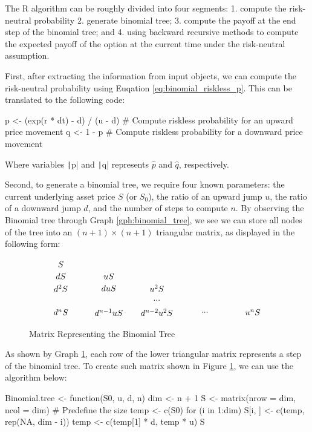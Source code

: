 The R algorithm can be roughly divided into four segments: 1. compute the risk-neutral probability 2. generate binomial tree; 3. compute the payoff at the end step of the binomial tree; and 4. using backward recursive methods to compute the expected payoff of the option at the current time under the risk-neutral assumption.

First, after extracting the information from input objects, we can compute the risk-neutral probability using Euqation \ref{eq:binomial_riskless_p}. This can be translated to the following code:

\begin{Rminted}
p <- (exp(r * dt) - d) / (u - d) # Compute riskless probability for an upward price movement
q <- 1 - p # Compute riskless probability for a downward price movement
\end{Rminted}

Where variables \texttt|p| and \texttt|q| represents $\hat{p}$ and $\hat{q}$, respectively.

Second, to generate a binomial tree, we require four known parameters: the current underlying asset price $S$ (or $S_0$), the ratio of an upward jump $u$, the ratio of a downward jump $d$, and the number of steps to compute $n$. By observing the Binomial tree through Graph \ref{gph:binomial_tree}, we see we can store all nodes of the tree into an $(n+1)\times (n+1)$ triangular matrix, as displayed in the following form:

\begin{figure}[H]
    \centering
    \[\tikz{
        \node (a) at (0, 2) {$S$};
        \node (b) at (0, 1.5) {$dS$};
        \node (c) at (2, 1.5) {$uS$};
        \node (d) at (0, 1) {$d^2S$};
        \node (e) at (2, 1) {$duS$};
        \node (f) at (4, 1) {$u^2S$};
        \node (g) at (4, 0.5) {$...$};
        \node (h) at (0, 0) {$d^nS$};
        \node (i) at (2, 0) {$d^{n-1}uS$};
        \node (j) at (4, 0) {$d^{n-2}u^2S$};
        \node (k) at (6, 0) {$...$};
        \node (l) at (8, 0) {$u^nS$};
    }\]
    \caption{Matrix Representing the Binomial Tree} \label{gph:tree_matrix}
\end{figure}

As shown by Graph \ref{gph:tree_matrix}, each row of the lower triangular matrix represents a step of the binomial tree. To create such matrix shown in Figure \ref{gph:tree_matrix}, we can use the algorithm below:

\begin{Rminted}
Binomial.tree <- function(S0, u, d, n) {
    dim <- n + 1
    S <- matrix(nrow = dim, ncol = dim) # Predefine the size
    temp <- c(S0)
    for (i in 1:dim) {
        S[i, ] <- c(temp, rep(NA, dim - i))
        temp <- c(temp[1] * d, temp * u)
    }
    S
}
\end{Rminted}

